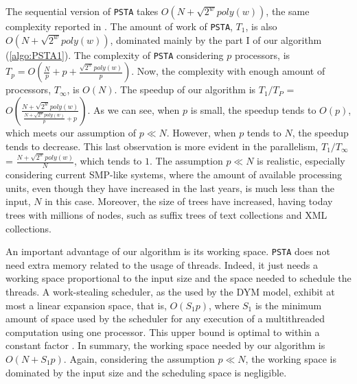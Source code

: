 The sequential version of {\tt PSTA} takes $O(N+\sqrt{2^{w}}poly(w))$, the same complexity reported in \cite{Navarro:2014:FFS:2620785.2601073}. The amount of work of {\tt PSTA}, $T_1$, is also $O(N+\sqrt{2^{w}}poly(w))$, dominated mainly by the part I of our algorithm (\ref{algo:PSTA1}). The complexity of {\tt PSTA} considering $p$ processors, is $T_p = O(\frac{N}{p}+p+\frac{\sqrt{2^{w}}poly(w)}{p})$. Now, the complexity with enough amount of processors, $T_\infty$, is $O(N)$. The speedup of our algorithm is $T_1/T_P$ = $O(\frac{N+\sqrt{2^{w}}poly(w)}{\frac{N+\sqrt{2^{w}}poly(w)}{p}+p})$. As we can see, when $p$ is small, the speedup tends to $O(p)$, which meets our assumption of $p\ll N$. However, when $p$ tends to $N$, the speedup tends to decrease. This last observation is more evident in the parallelism, $T_1/T_{\infty}$ = $\frac{N+\sqrt{2^{w}}poly(w)}{N}$, which tends to $1$. The assumption $p\ll N$ is realistic, especially considering current SMP-like systems, where the amount of available processing units, even though they have increased in the last years, is much less than the input, $N$ in this case. Moreover, the size of trees have increased, having today trees with millions of nodes, such as suffix trees of text collections and XML collections.

An important advantage of our algorithm is its working space. {\tt PSTA} does not need extra memory related to the usage of threads. Indeed, it just needs a working space proportional to the input size and the space needed to schedule the threads. A work-stealing scheduler, as the used by the DYM model, exhibit at most a linear expansion space, that is, $O(S_1p)$, where $S_1$ is the minimum amount of space used by the scheduler for any execution of a multithreaded computation using one processor. This upper bound is optimal to within a constant factor \cite{Blumofe:1999:SMC:324133.324234}. In summary, the working space needed by our algorithm is $O(N+S_1p)$. Again, considering the assumption $p\ll N$, the working space is dominated by the input size and the scheduling space is negligible.